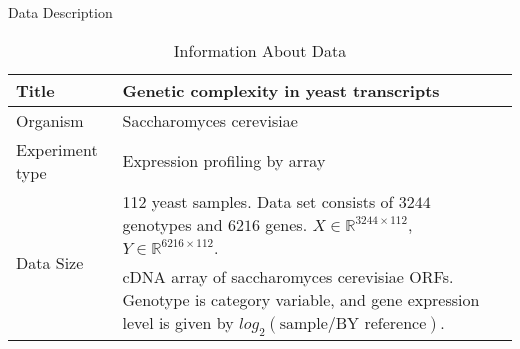 \begin{frame}{Data Description}
\begin{table}[h]
        \centering

        \begin{tabular}{|l|p{7cm}|}
            \hline
            Title                           &   Genetic complexity in yeast transcripts \\ \hline
            Organism                        &   Saccharomyces cerevisiae                \\ \hline
            Experiment type                 &   Expression profiling by array           \\ \hline
            \multirow{3}{*}{Data Size}      &   112 yeast samples. Data set consists of $3244$ genotypes and $6216$ genes.  $X \in \mathbb{R}^{3244\times112}$, $Y \in \mathbb{R}^{6216\times112}$. \\ \hline
           \multirow{3}{*}{Description}     &   cDNA array of saccharomyces cerevisiae ORFs. Genotype is category variable, and gene expression level is given by  $log_2(\text{sample} / \text{BY reference})$. \\ \hline
        \end{tabular}
        \caption{Information About Data}
    \end{table}
\end{frame}

    

      

